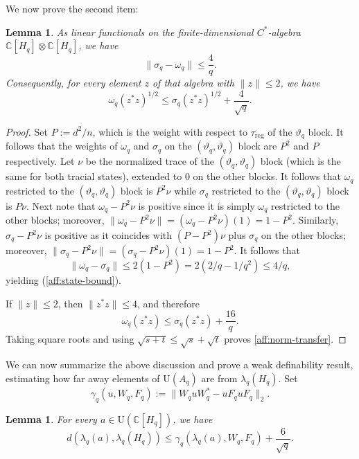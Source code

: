 \documentclass[12pt]{amsart}
\numberwithin{equation}{section}
\newtheorem{lem}[thm]{Lemma}
\theoremstyle{definition}
\newcommand{\C}{\mathbb{C}}
\def \reg{\operatorname{reg}}
\begin{document}
We now prove the second item:

\begin{lem}
\label{aff:state-comparison}
As linear functionals on the finite-dimensional $C^*$-algebra
$\C[H_q]\otimes\C[H_q]$, we have
\begin{equation}
\label{aff:state-bound}
 \|\sigma_q-\omega_q\|\le \frac4q.
\end{equation}
Consequently, for every element $z$ of that algebra with
$\|z\|\le2$, we have
\begin{equation}
\label{aff:norm-transfer}
 \omega_q(z^*z)^{1/2}
 \le \sigma_q(z^*z)^{1/2}+\frac4{\sqrt q}.
\end{equation}
\end{lem}

\begin{proof}
Set $P:=d^2/n$, which is the weight with respect to $\tau_{\reg}$ of the $\vartheta_q$ block. It follows that the weights of $\omega_q$ and $\sigma_q$ on the $(\vartheta_q,\vartheta_q)$ block are $P^2$ and $P$ respectively.  Let $\nu$ be the normalized trace of the $(\vartheta_q,\vartheta_q)$ block (which is the same for both tracial states), extended to $0$ on the other blocks.  It follows that $\omega_q$ restricted to the $(\vartheta_q,\vartheta_q)$ block is $P^2\nu$ while $\sigma_q$ restricted to the $(\vartheta_q,\vartheta_q)$ block is $P\nu$.  Next note that $\omega_q-P^2\nu$ is positive since it is simply $\omega_q$ restricted to the other blocks; moreover, $\|\omega_q-P^2\nu\|=(\omega_q-P^2\nu)(1)=1-P^2$.  Similarly, $\sigma_q-P^2\nu$ is positive as it coincides with $(P-P^2)\nu$ plus $\sigma_q$ on the other blocks; moreover, $\|\sigma_q-P^2\nu\|=(\sigma_q-P^2\nu)(1)=1-P^2$.   It follows that $$\|\omega_q-\sigma_q\|\leq 2(1-P^2)=2(2/q-1/q^2)\leq 4/q,$$
yielding (\ref{aff:state-bound}).

If $\|z\|\le2$, then $\|z^*z\|\le4$, and therefore
\[
 \omega_q(z^*z)\le\sigma_q(z^*z)+\frac{16}{q}.
\]
Taking square roots and using $\sqrt{s+t}\le\sqrt s+\sqrt t$
proves \eqref{aff:norm-transfer}.
\end{proof}

We can now summarize the above discussion and prove a weak definability result, estimating how far away elements of $\mathrm{U}(A_q)$ are from $\lambda_q(H_q)$.  Set $$\gamma_q(u,W_q,F_q):=\|W_quW_q^*-uF_quF_q\|_2.$$

\begin{lem}
\label{aff:fourier-rounding}
For every $a\in\mathrm{U}(\C[H_q])$, we have
\begin{equation}
\label{aff:algebra-rounding}
 d(\lambda_q(a),\lambda_q(H_q))
 \le
 \gamma_q(\lambda_q(a),W_q,F_q)
 +\frac6{\sqrt q}.
\end{equation}
\end{lem}
\end{document}

